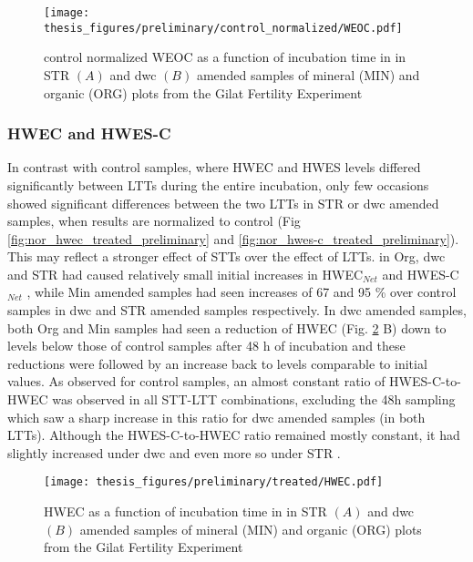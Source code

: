 \documentclass[12pt]{report}
\begin{document}
		
		\begin{figure}[H]
			\centering
			\texttt{[image: thesis\_figures/preliminary/control\_normalized/WEOC.pdf]}
			\caption{control normalized WEOC  as a function of incubation time in in STR $\left(A\right)$ and \gls{dwc} $\left(B\right)$ amended samples of mineral (MIN) and organic (ORG) plots from the Gilat Fertility Experiment}
			\label{fig:nor_weoc_treated_preliminary}
		\end{figure}
		
		
		
		\subsubsection{HWEC and HWES-C}
		In contrast with control samples, where HWEC and HWES levels differed significantly between LTTs during the entire incubation, only few occasions showed significant differences between the two LTTs in STR or \gls{dwc} amended samples, when results are normalized to control (Fig \ref{fig:nor_hwec_treated_preliminary} and \ref{fig:nor_hwes-c_treated_preliminary}). This may reflect a stronger effect of STTs over the effect of LTTs.
		in Org, \gls{dwc} and STR had caused relatively small initial increases in HWEC$_{Net}$ and HWES-C$_{Net}$  , while Min amended samples had seen increases of 67 and 95 \% over control samples in \gls{dwc} and STR amended samples respectively. In \gls{dwc} amended samples, both Org and Min samples  had seen a reduction of HWEC (Fig. \ref{fig:hwec_treated_preliminary} B) down to levels below those of control samples after 48 h of incubation and these reductions were followed by an increase back to levels comparable to initial values.
		As observed for control samples, an almost constant ratio of HWES-C-to-HWEC was observed in all STT-LTT combinations, excluding the 48h sampling which saw a sharp increase in this ratio for \gls{dwc} amended samples (in both LTTs). Although the HWES-C-to-HWEC ratio remained mostly constant, it had slightly increased under \gls{dwc} and even more so under STR .
		
		\begin{figure}[H]
			\centering
			\texttt{[image: thesis\_figures/preliminary/treated/HWEC.pdf]}
			\caption{HWEC  as a function of incubation time in in STR $\left(A\right)$ and \gls{dwc} $\left(B\right)$ amended samples of mineral (MIN) and organic (ORG) plots from the Gilat Fertility Experiment}
			\label{fig:hwec_treated_preliminary}
		\end{figure}
		
\end{document}
